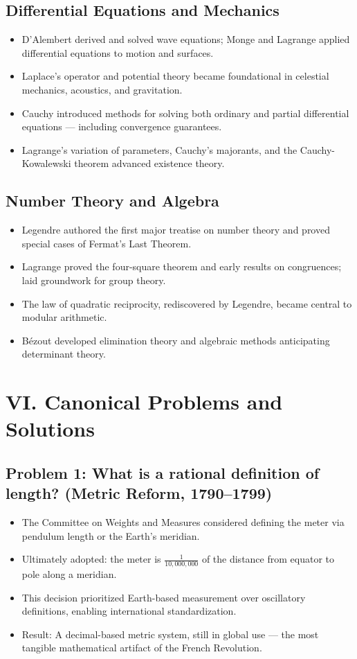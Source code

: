 \documentclass[9pt]{article}
\begin{document}
\subsection*{Differential Equations and Mechanics}
\begin{itemize}
  \item D’Alembert derived and solved wave equations; Monge and Lagrange applied differential equations to motion and surfaces.
  \item Laplace's operator and potential theory became foundational in celestial mechanics, acoustics, and gravitation.
  \item Cauchy introduced methods for solving both ordinary and partial differential equations — including convergence guarantees.
  \item Lagrange’s variation of parameters, Cauchy’s majorants, and the Cauchy-Kowalewski theorem advanced existence theory.
\end{itemize}

\subsection*{Number Theory and Algebra}
\begin{itemize}
  \item Legendre authored the first major treatise on number theory and proved special cases of Fermat’s Last Theorem.
  \item Lagrange proved the four-square theorem and early results on congruences; laid groundwork for group theory.
  \item The law of quadratic reciprocity, rediscovered by Legendre, became central to modular arithmetic.
  \item Bézout developed elimination theory and algebraic methods anticipating determinant theory.
\end{itemize}

\newpage

\section*{VI. Canonical Problems and Solutions}

\subsection*{Problem 1: What is a rational definition of length? (Metric Reform, 1790–1799)}
\begin{itemize}
  \item The Committee on Weights and Measures considered defining the meter via pendulum length or the Earth’s meridian.
  \item Ultimately adopted: the meter is \(\frac{1}{10{,}000{,}000}\) of the distance from equator to pole along a meridian.
  \item This decision prioritized Earth-based measurement over oscillatory definitions, enabling international standardization.
  \item Result: A decimal-based metric system, still in global use — the most tangible mathematical artifact of the French Revolution.
\end{itemize}
\end{document}
